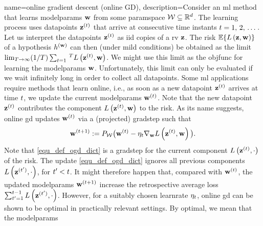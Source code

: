 {name={online gradient descent (online GD)}, 
	description={Consider  an \gls{ml} method that learns \glspl{modelparam} 
		${\bf w}$ from some \gls{paramspace} $\mathcal{W} \subseteq \mathbb{R}^{d}$. 
		The learning process uses \glspl{datapoint} ${\bf z}^{(t)}$ that arrive at consecutive time instants $t=1, \,2, \,\dots$. 
		Let us interpret the \glspl{datapoint} ${\bf z}^{(t)}$ as \gls{iid} copies 
		of a \gls{rv} ${\bf z}$. The \gls{risk} $\mathbb{E}\{ L\left({\bf z},{\bf w} \right) \}$ of a 
		\gls{hypothesis} $h^{({\bf w})}$ can then (under mild conditions) be obtained as the limit 
		$\lim_{T\rightarrow \infty} (1/T)\sum_{t=1}\,^{T} L\left({\bf z}^{(t)},{\bf w} \right)$. 
		We might use this limit as the \gls{objfunc} for learning the \glspl{modelparam} ${\bf w}$. 
		Unfortunately, this limit can only be evaluated if we wait infinitely long in order to collect all \glspl{datapoint}. 
		Some \gls{ml} applications require methods that learn online, i.e., as soon as a new \gls{datapoint} ${\bf z}^{(t)}$ 
		arrives at time $t$, we update the current \glspl{modelparam} ${\bf w}^{(t)}$. Note that 
		the new \gls{datapoint} ${\bf z}^{(t)}$ contributes the component $L\left({\bf z}^{(t)},{\bf w} \right)$ 
		to the \gls{risk}. As its name suggests, online \gls{gd} updates ${\bf w}^{(t)}$ via a (projected) \gls{gradstep} such that
		\begin{equation} 
			\label{equ_def_ogd_dict}
 			{\bf w}^{(t+1)} := P_{\mathcal{W}}\big( {\bf w}^{(t)} - \eta_{t} \nabla_{{\bf w}} L\left({\bf z}^{(t)},{\bf w} \right)\big). 
		\end{equation} 
		Note that \eqref{equ_def_ogd_dict} is a \gls{gradstep} for the current component $L\left({\bf z}^{(t)},\cdot \right)$ 
		of the \gls{risk}. The update \eqref{equ_def_ogd_dict} ignores all previous components $L\left({\bf z}^{(t')},\cdot \right)$, 
		for $t' < t$. It might therefore happen that, compared with ${\bf w}^{(t)}$, the updated \glspl{modelparam} 
		${\bf w}^{(t+1)}$ increase the retrospective average \gls{loss} $\sum_{t'=1}^{t-1} L\left({\bf z}^{(t')},\cdot \right)$. 
		However, for a suitably chosen \gls{learnrate} $\eta_{t}$, online \gls{gd} can be shown 
		to be optimal in practically relevant settings. By optimal, we mean that the \glspl{modelparam} 
}}
